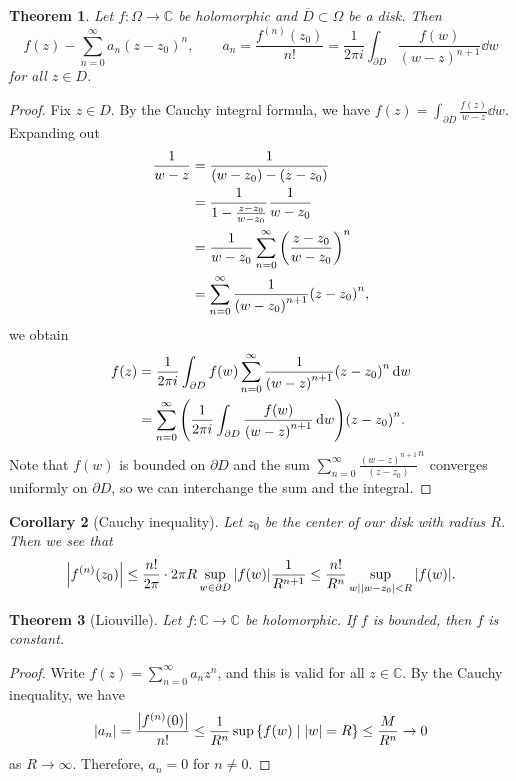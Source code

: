\documentclass[leqno, openany]{memoir}
\newtheorem{thm}{Theorem}[section]
\newtheorem{cor}[thm]{Corollary}
\theoremstyle{definition}
\theoremstyle{remark}
\theoremstyle{plain}
\theoremstyle{definition}
\theoremstyle{remark}
\newcommand{\C}{\mathbb{C}}
\newcommand{\ol}[1]{\overline{#1}}
\begin{document}
\begin{thm} Let $f \colon \Omega \to \C$ be holomorphic and $\ol{D} \subset
    \Omega$ be a disk. Then \[ f(z) - \sum_{n=0}^{\infty} a_n{(z-z_0)}^n,
    \qquad a_n = \frac{f^{(n)}(z_0)}{n!} = \frac{1}{2 \pi i} \int_{\partial D}
\frac{f(w)}{{(w-z)}^{n+1}} \dd{w} \] for all $z \in D$.  \end{thm}

\begin{proof} Fix $z \in D$. By the Cauchy integral formula, we have $f(z) =
    \int_{\partial D} \frac{f(z)}{w-z} \dd{w}$. Expanding out \begin{align*}
        \frac{1}{w-z} &= \frac{1}{(w-z_0) - (z-z_0)} \\ &=
        \frac{1}{1-\frac{z-z_0}{w-z_0}} \frac{1}{w-z_0} \\ &= \frac{1}{w-z_0}
        \sum_{n=0}^{\infty} {\qty(\frac{z-z_0}{w-z_0})}^n \\ &=
        \sum_{n=0}^{\infty} \frac{1}{{(w-z_0)}^{n+1}} {(z-z_0)}^n, \end{align*}
        we obtain \begin{align*} f(z) &= \frac{1}{2 \pi i} \int_{\partial D}
            f(w) \sum_{n=0}^{\infty} \frac{1}{{(w-z)}^{n+1}} {(z-z_0)}^n \dd{w}
            \\ &= \sum_{n=0}^{\infty} \qty(\frac{1}{2 \pi i} \int_{\partial D}
        \frac{f(w)}{{(w-z)}^{n+1}} \dd{w}) {(z-z_0)}^n.  \end{align*} Note that
        $f(w)$ is bounded on $\partial D$ and the sum $\sum_{n=0}^{\infty}
        \frac{{(w-z)}^{n+1}}{(z-z_0)}^n$ converges uniformly on $\partial D$,
        so we can interchange the sum and the integral.  \end{proof}

\begin{cor}[Cauchy inequality] Let $z_0$ be the center of our disk with radius
    $R$. Then we see that \[ \abs{f^{(n)}(z_0)} \leq \frac{n!}{2\pi} \cdot 2
    \pi R \sup_{w \in \partial D} \abs{f(w)} \frac{1}{R^{n+1}} \leq
\frac{n!}{R^n} \sup_{w \mid \abs{w-z_0} < R} \abs{f(w)}. \] \end{cor}

\begin{thm}[Liouville] Let $f \colon \C \to \C$ be holomorphic. If $f$ is
bounded, then $f$ is constant.  \end{thm}

\begin{proof} Write $f(z) = \sum_{n=0}^{\infty} a_n z^n$, and this is valid for
    all $z \in \C$. By the Cauchy inequality, we have \[ \abs{a_n} =
    \frac{\abs{f^{(n)}(0)}}{n!} \leq \frac{1}{R^n} \sup \qty{f(w) \mid \abs{w}
= R} \leq \frac{M}{R^n} \to 0 \] as $R \to \infty$. Therefore, $a_n = 0$ for $n
\neq 0$.  \end{proof}
\end{document}
